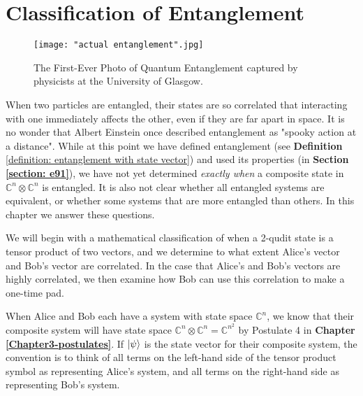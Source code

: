 
\chapter{Classification of Entanglement} %

\label{Chapter6-classification of entanglement} %
\begin{figure}[h]
    \centering
    \texttt{[image: "actual entanglement".jpg]}
    \caption{The First-Ever Photo of Quantum Entanglement captured by physicists at the University of Glasgow. \cite{moreau2019imaging}}
    \label{fig:actual entanglemen}
\end{figure}

When two particles are entangled, their states are so correlated that interacting with one immediately affects the other, even if they are far apart in space.  It is no wonder that Albert Einstein once described entanglement as "spooky action at a distance". While at this point we have defined entanglement (see {\bf{Definition}} \ref{definition: entanglement with state vector}) and used its properties (in \textbf{Section \ref{section: e91}}), we have not yet determined {\emph{exactly when}} a composite state in $\mathbb{C}^n \otimes \mathbb{C}^n$ is entangled.
It is also not clear whether all entangled systems are equivalent, or whether some systems that are more entangled than others.  In this chapter we answer these questions.


We will begin with a mathematical classification of when a 2-qudit state is a tensor product of two vectors, and we determine to what extent Alice's vector and Bob's vector are correlated. In the case that Alice's and Bob's vectors are highly correlated, we then examine how Bob can use this correlation to make a one-time pad. 


When Alice and Bob each have a system with state space ${\mathbb{C}}^n$, we know that their composite system will have state space ${\mathbb{C}}^n \otimes {\mathbb{C}}^n={\mathbb{C}}^{n^2}$ by Postulate 4 in \textbf{Chapter \ref{Chapter3-postulates}}. If $\ket{\psi}$ is the state vector for their composite system, the convention is to think of all terms on the left-hand side of the tensor product symbol as representing Alice's system, and all terms on the right-hand side as representing Bob's system.  

